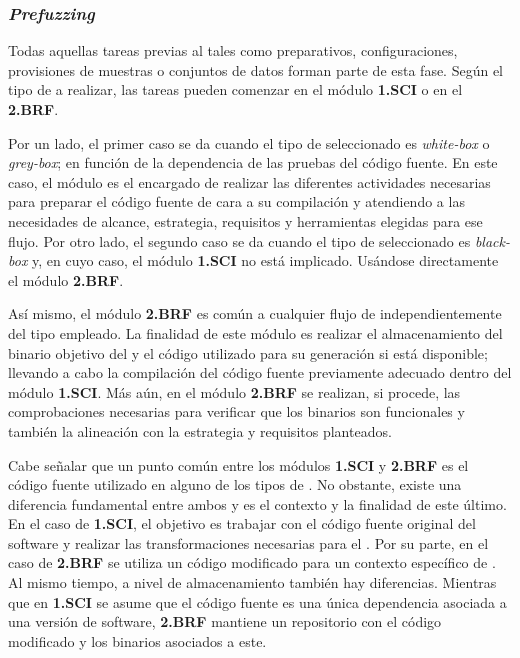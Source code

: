 \documentclass[10pt,conference,a4paper]{IEEEtran}
\begin{document}

\subsubsection{\textit{Prefuzzing}}
\label{Fase_prefuzzing}

Todas aquellas tareas previas al {\fz} tales como preparativos, configuraciones, provisiones de muestras o conjuntos de datos forman parte de esta fase. Según el tipo de {\fz} a realizar, las tareas pueden comenzar en el módulo \textbf{1.SCI} o en el \textbf{2.BRF}.

Por un lado, el primer caso se da cuando el tipo de {\fz} seleccionado es \textit{white-box} o \textit{grey-box}; en función de la dependencia de las pruebas del código fuente. En este caso, el módulo es el encargado de realizar las diferentes actividades necesarias para preparar el código fuente de cara a su compilación y atendiendo a las necesidades de alcance, estrategia, requisitos y herramientas elegidas para ese flujo. Por otro lado, el segundo caso se da cuando el tipo de {\fz} seleccionado es \textit{black-box} y, en cuyo caso, el módulo \textbf{1.SCI} no está implicado. Usándose directamente el módulo \textbf{2.BRF}.

Así mismo, el módulo \textbf{2.BRF} es común a cualquier flujo de {\fz} independientemente del tipo empleado. La finalidad de este módulo es realizar el almacenamiento del binario objetivo del {\fz} y el código utilizado para su generación si está disponible; llevando a cabo la compilación del código fuente previamente adecuado dentro del módulo \textbf{1.SCI}. Más aún, en el módulo \textbf{2.BRF} se realizan, si procede, las comprobaciones necesarias para verificar que los binarios son funcionales y también la alineación con la estrategia y requisitos planteados.

Cabe señalar que un punto común entre los módulos \textbf{1.SCI} y \textbf{2.BRF} es el código fuente utilizado en alguno de los tipos de {\fz}. No obstante, existe una diferencia fundamental entre ambos y es el contexto y la finalidad de este último. En el caso de \textbf{1.SCI}, el objetivo es trabajar con el código fuente original del software y realizar las transformaciones necesarias para el {\fz}. Por su parte, en el caso de \textbf{2.BRF} se utiliza un código modificado para un contexto específico de {\fz}. Al mismo tiempo, a nivel de almacenamiento también hay diferencias. Mientras que en \textbf{1.SCI} se asume que el código fuente es una única dependencia asociada a una versión de software, \textbf{2.BRF} mantiene un repositorio con el código modificado y los binarios asociados a este.
\end{document}
